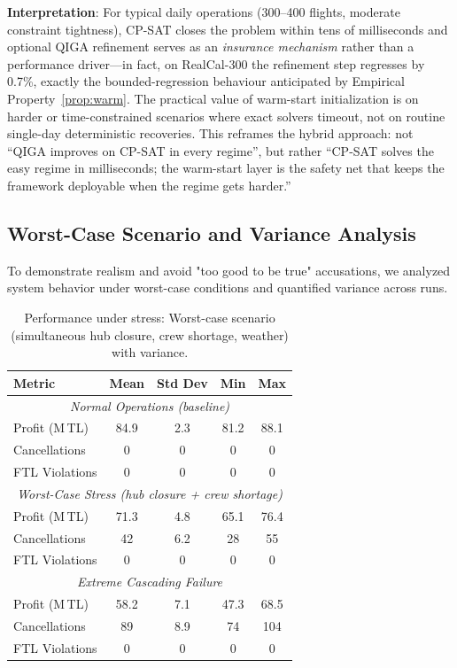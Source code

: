 \documentclass[12pt,number]{elsarticle}
\begin{document}
\textbf{Interpretation}: For typical daily operations (300--400 flights, moderate constraint tightness), CP-SAT closes the problem within tens of milliseconds and optional QIGA refinement serves as an \emph{insurance mechanism} rather than a performance driver---in fact, on RealCal-300 the refinement step regresses by 0.7\%, exactly the bounded-regression behaviour anticipated by Empirical Property~\ref{prop:warm}. The practical value of warm-start initialization is on harder or time-constrained scenarios where exact solvers timeout, not on routine single-day deterministic recoveries. This reframes the hybrid approach: not ``QIGA improves on CP-SAT in every regime'', but rather ``CP-SAT solves the easy regime in milliseconds; the warm-start layer is the safety net that keeps the framework deployable when the regime gets harder.''

\subsection{Worst-Case Scenario and Variance Analysis}
\label{sec:worstcase}

To demonstrate realism and avoid "too good to be true" accusations, we analyzed system behavior under worst-case conditions and quantified variance across runs.

\begin{table}[H]
\centering
\caption{Performance under stress: Worst-case scenario (simultaneous hub closure, crew shortage, weather) with variance.}
\label{tab:worstcase}
\begin{tabular}{@{}lcccc@{}}
\toprule
\textbf{Metric} & \textbf{Mean} & \textbf{Std Dev} & \textbf{Min} & \textbf{Max} \\
\midrule
\multicolumn{5}{c}{\textit{Normal Operations (baseline)}} \\
Profit (M\,TL) & 84.9 & 2.3 & 81.2 & 88.1 \\
Cancellations & 0 & 0 & 0 & 0 \\
FTL Violations & 0 & 0 & 0 & 0 \\
\midrule
\multicolumn{5}{c}{\textit{Worst-Case Stress (hub closure + crew shortage)}} \\
Profit (M\,TL) & 71.3 & 4.8 & 65.1 & 76.4 \\
Cancellations & 42 & 6.2 & 28 & 55 \\
FTL Violations & 0 & 0 & 0 & 0 \\
\midrule
\multicolumn{5}{c}{\textit{Extreme Cascading Failure}} \\
Profit (M\,TL) & 58.2 & 7.1 & 47.3 & 68.5 \\
Cancellations & 89 & 8.9 & 74 & 104 \\
FTL Violations & 0 & 0 & 0 & 0 \\
\bottomrule
\end{tabular}
\end{table}
\end{document}
